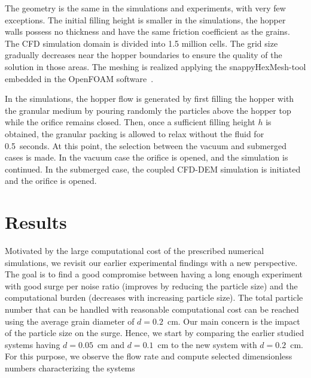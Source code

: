\documentclass[twoside,twocolumn,9pt]{article}
\providecommand{\DIFadd}[1]{{\protect\color{blue}\uwave{#1}}} %
\providecommand{\DIFaddbegin}{} %
\providecommand{\DIFaddend}{} %
\newcommand{\DIFaddincludegraphics}[2][]{{\color{blue}\fbox{\DIFOincludegraphics[#1]{#2}}}} %
\DeclareRobustCommand{\DIFaddbegin}{\DIFOaddbegin \let\includegraphics\DIFaddincludegraphics} %
\DeclareRobustCommand{\DIFaddend}{\DIFOaddend \let\includegraphics\DIFOincludegraphics} %
\begin{document}
The geometry is the same in the simulations and experiments, with very few exceptions. The initial filling height is smaller in the simulations, 
the hopper walls possess no thickness and have the same friction coefficient as the grains. The CFD simulation domain is divided into 1.5 million cells. The grid size gradually decreases near the hopper boundaries to ensure the quality of the solution in those areas. The meshing is realized applying the snappyHexMesh-tool embedded in the OpenFOAM software~\cite{openfoamdoc}.
%


In the simulations, the hopper flow is generated by first filling the hopper with the granular medium by pouring 
randomly the particles above the hopper top while the orifice remains closed. Then, once a sufficient filling height $h$ is
obtained, the granular packing is allowed to relax without the fluid for 0.5~seconds. At this point, the selection between the 
vacuum and submerged cases is made. In the vacuum case the orifice is opened, and the simulation is continued.
In the submerged case, the coupled CFD-DEM simulation is initiated and the orifice is opened. 


\section{Results}

Motivated by the large computational cost of the prescribed numerical simulations, we revisit our earlier experimental findings with a new perspective.
The goal is to find a good compromise between having a long enough experiment with good surge per noise ratio (improves by reducing the particle size) and the computational burden (decreases with increasing particle size). The total particle number that can be handled with reasonable computational cost can be reached using the  average grain diameter of $d=0.2$~cm. 
Our main concern is the impact of the particle size on the surge. 
Hence, we start by comparing the earlier studied systems  having $d=0.05$~cm and $d=0.1$~cm \DIFaddbegin \DIFadd{\mbox{%
\cite{koivistoSubmitted} }\hspace{0pt}%
}\DIFaddend to the new system with $d=0.2$~cm. For this purpose, we observe the flow rate and compute selected dimensionless numbers characterizing the systems
\end{document}
